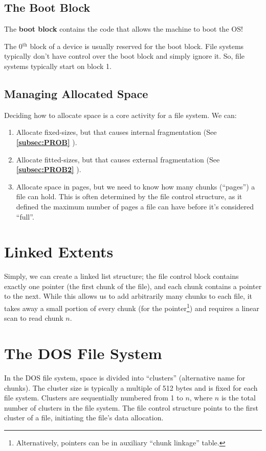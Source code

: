 \documentclass{report}
\newcommand{\definitionBegin}[1]{\begin{tcolorbox}[title={Definition: #1}]}
\newcommand{\definitionEnd}{\end{tcolorbox}}
\newcommand{\refto}[2]{\textbf{\ref{#1:#2} \nameref{#1:#2}}}
\begin{document}
\subsection{The Boot Block}
\definitionBegin{Boot Block}
The \textbf{boot block} contains the code that allows the machine to boot the OS!
\definitionEnd

The 0$^\text{th}$ block of a device is usually reserved for the boot block. File systems typically don't
have control over the boot block and simply ignore it. So, file systems typically start on block 1.


\subsection{Managing Allocated Space}
Deciding how to allocate space is a core activity for a file system. We can:

\begin{enumerate}[label=\textit{(\roman*)}]
\item Allocate fixed-sizes, but that causes internal fragmentation (See \refto{subsec}{PROB}).
\item Allocate fitted-sizes, but that causes external fragmentation (See \refto{subsec}{PROB2}).
\item Allocate space in pages, but we need to know how many chunks (``pages'') a file can hold. This
  is often determined by the file control structure, as it defined the maximum number of pages a
  file can have before it's considered ``full''.
\end{enumerate}


\section{Linked Extents}
Simply, we can create a linked list structure; the file control block contains exactly one pointer
(the first chunk of the file), and each chunk contains a pointer to the next. While this allows us to add
arbitrarily many chunks to each file, it takes away a small portion of every chunk (for the
pointer\footnote{Alternatively, pointers can be in auxiliary ``chunk linkage'' table.})  and
requires a linear scan to read chunk $n$.


\section{The DOS File System}
In the DOS file system, space is divided into ``clusters'' (alternative name for chunks). The
cluster size is typically a multiple of 512 bytes and is fixed for each file system. Clusters are
sequentially numbered from 1 to $n$, where $n$ is the total number of clusters in the file
system. The file control structure points to the first cluster of a file, initiating the file's data
allocation.
\end{document}
